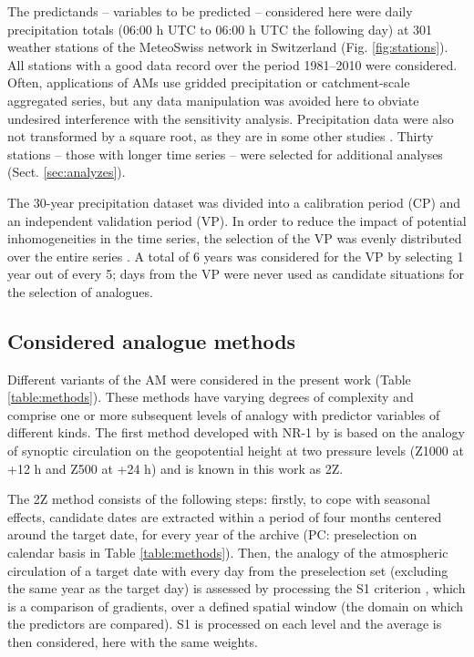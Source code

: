 \documentclass{ametsoc}
\begin{document}
	The predictands -- variables to be predicted -- considered here were daily precipitation totals (06:00 h UTC to 06:00 h UTC the following day) at 301 weather stations of the MeteoSwiss network in Switzerland (Fig. \ref{fig:stations}). All stations with a good data record over the period 1981--2010 were considered. Often, applications of AMs use gridded precipitation or catchment-scale aggregated series, but any data manipulation was avoided here to obviate undesired interference with the sensitivity analysis. Precipitation data were also not transformed by a square root, as they are in some other studies \cite[see e.g.][]{Bontron2004}. Thirty stations -- those with longer time series -- were selected for additional analyses (Sect. \ref{sec:analyzes}).
	
	The 30-year precipitation dataset was divided into a calibration period (CP) and an independent validation period (VP). In order to reduce the impact of potential inhomogeneities in the time series, the selection of the VP was evenly distributed over the entire series \citep[as in][]{BenDaoud2010}. A total of 6 years was considered for the VP by selecting 1 year out of every 5; days from the VP were never used as candidate situations for the selection of analogues.
	
	
	\subsection{Considered analogue methods}
	\label{sec:ams}
	
	Different variants of the AM were considered in the present work (Table \ref{table:methods}). These methods have varying degrees of complexity and comprise one or more subsequent levels of analogy with predictor variables of different kinds. The first method developed with NR-1 by \citet{Bontron2004} is based on the analogy of synoptic circulation on the geopotential height at two pressure levels (Z1000 at +12 h and Z500 at +24 h) and is known in this work as 2Z.
	
	The 2Z method consists of the following steps: firstly, to cope with seasonal effects, candidate dates are extracted within a period of four months centered around the target date, for every year of the archive (PC: preselection on calendar basis in Table \ref{table:methods}). Then, the analogy of the atmospheric circulation of a target date with every day from the preselection set (excluding the same year as the target day) is assessed by processing the S1 criterion \citep[Eq.\ \ref{eq:S1}, ][]{Teweles1954, Drosdowsky2003}, which is a comparison of gradients, over a defined spatial window (the domain on which the predictors are compared). S1 is processed on each level and the average is then considered, here with the same weights.
	
\end{document}
